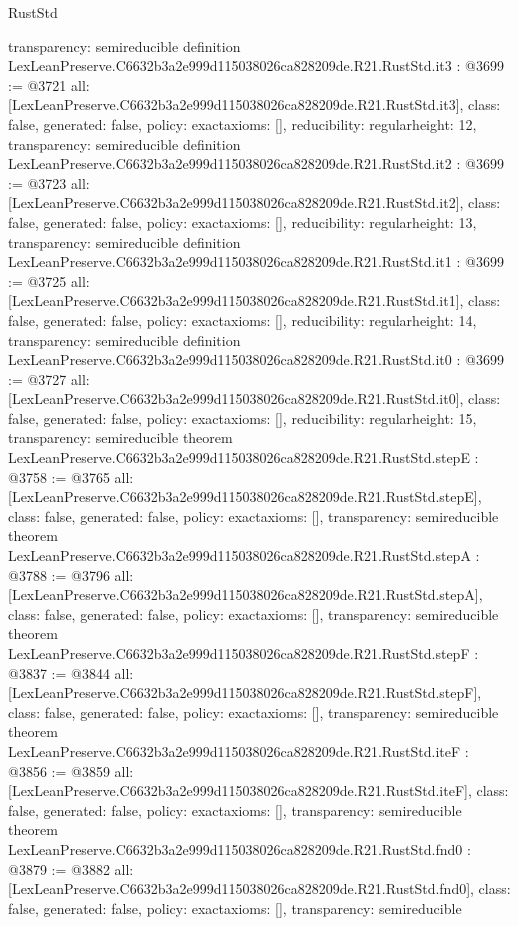 \begin{lexlean}{RustStd}
\begin{coremodule}
{  transparency: semireducible
}
definition LexLeanPreserve.C6632b3a2e999d115038026ca828209de.R21.RustStd.it3 : @3699 := @3721 {
  all: [LexLeanPreserve.C6632b3a2e999d115038026ca828209de.R21.RustStd.it3],
  class: false,
  generated: false,
  policy: exact{axioms: []},
  reducibility: regular{height: 12},
  transparency: semireducible
}
definition LexLeanPreserve.C6632b3a2e999d115038026ca828209de.R21.RustStd.it2 : @3699 := @3723 {
  all: [LexLeanPreserve.C6632b3a2e999d115038026ca828209de.R21.RustStd.it2],
  class: false,
  generated: false,
  policy: exact{axioms: []},
  reducibility: regular{height: 13},
  transparency: semireducible
}
definition LexLeanPreserve.C6632b3a2e999d115038026ca828209de.R21.RustStd.it1 : @3699 := @3725 {
  all: [LexLeanPreserve.C6632b3a2e999d115038026ca828209de.R21.RustStd.it1],
  class: false,
  generated: false,
  policy: exact{axioms: []},
  reducibility: regular{height: 14},
  transparency: semireducible
}
definition LexLeanPreserve.C6632b3a2e999d115038026ca828209de.R21.RustStd.it0 : @3699 := @3727 {
  all: [LexLeanPreserve.C6632b3a2e999d115038026ca828209de.R21.RustStd.it0],
  class: false,
  generated: false,
  policy: exact{axioms: []},
  reducibility: regular{height: 15},
  transparency: semireducible
}
theorem LexLeanPreserve.C6632b3a2e999d115038026ca828209de.R21.RustStd.stepE : @3758 := @3765 {
  all: [LexLeanPreserve.C6632b3a2e999d115038026ca828209de.R21.RustStd.stepE],
  class: false,
  generated: false,
  policy: exact{axioms: []},
  transparency: semireducible
}
theorem LexLeanPreserve.C6632b3a2e999d115038026ca828209de.R21.RustStd.stepA : @3788 := @3796 {
  all: [LexLeanPreserve.C6632b3a2e999d115038026ca828209de.R21.RustStd.stepA],
  class: false,
  generated: false,
  policy: exact{axioms: []},
  transparency: semireducible
}
theorem LexLeanPreserve.C6632b3a2e999d115038026ca828209de.R21.RustStd.stepF : @3837 := @3844 {
  all: [LexLeanPreserve.C6632b3a2e999d115038026ca828209de.R21.RustStd.stepF],
  class: false,
  generated: false,
  policy: exact{axioms: []},
  transparency: semireducible
}
theorem LexLeanPreserve.C6632b3a2e999d115038026ca828209de.R21.RustStd.iteF : @3856 := @3859 {
  all: [LexLeanPreserve.C6632b3a2e999d115038026ca828209de.R21.RustStd.iteF],
  class: false,
  generated: false,
  policy: exact{axioms: []},
  transparency: semireducible
}
theorem LexLeanPreserve.C6632b3a2e999d115038026ca828209de.R21.RustStd.fnd0 : @3879 := @3882 {
  all: [LexLeanPreserve.C6632b3a2e999d115038026ca828209de.R21.RustStd.fnd0],
  class: false,
  generated: false,
  policy: exact{axioms: []},
  transparency: semireducible
}
\end{coremodule}
\end{lexlean}
